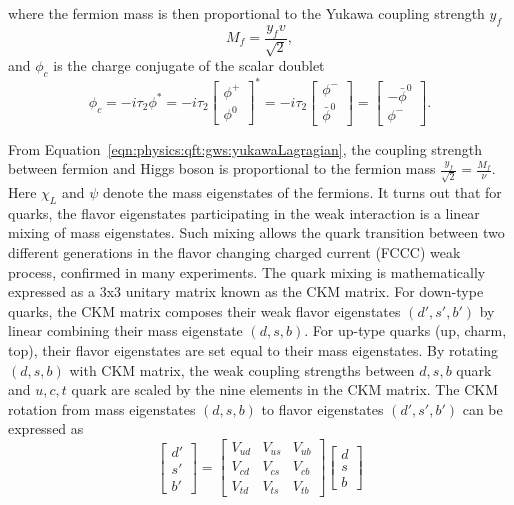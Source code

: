 \noindent where the fermion mass is then proportional to the Yukawa coupling strength $y_f$ 
\begin{equation}
    M_f =\frac{y_f v}{\sqrt{2}} ,  %
\end{equation}
\noindent and $\phi_c$ is the charge conjugate of the scalar doublet 
\begin{equation}
    \phi_c = -i\tau_2 \phi^* = -i\tau_2 \begin{bmatrix} \phi^+ \\ \phi^0 \end{bmatrix}^* = -i\tau_2 \begin{bmatrix} \phi^- \\ \bar{\phi}^0 \end{bmatrix} = \begin{bmatrix} - \bar{\phi}^0 \\ \phi^-   \end{bmatrix}.
\end{equation}


\noindent From Equation~\ref{eqn:physics:qft:gws:yukawaLagragian}, the coupling strength between fermion and Higgs boson  is proportional to the fermion mass $\frac{y_f}{\sqrt{2}} = \frac{M_f}{\nu}$. Here $\chi_L$ and $\psi$  denote the mass eigenstates of the fermions. It turns out that for quarks, the flavor eigenstates participating in the weak interaction is a linear mixing of mass eigenstates. Such mixing allows the quark transition between two different generations in the flavor changing charged current (FCCC) weak process, confirmed in many experiments. The quark mixing is mathematically expressed as a 3x3 unitary matrix known as the CKM matrix. For down-type quarks, the CKM matrix composes their weak flavor eigenstates $(d',s',b')$ by linear combining their mass eigenstate $(d,s,b)$. For up-type quarks (up, charm, top), their flavor eigenstates are set equal to their mass eigenstates. By rotating $(d,s,b)$ with CKM matrix, the weak coupling strengths between $d,s,b$ quark and $u,c,t$ quark are scaled by the nine elements in the CKM matrix. The CKM rotation from mass eigenstates $(d,s,b)$ to flavor eigenstates $(d',s',b')$ can be expressed as
\begin{equation}
    \begin{bmatrix}
        d' \\ s' \\ b' 
    \end{bmatrix} = 
     \begin{bmatrix}
        V_{ud} & V_{us} & V_{ub} \\ V_{cd} & V_{cs} & V_{cb} \\ V_{td} & V_{ts} & V_{tb}
    \end{bmatrix}   
    \begin{bmatrix}
        d \\ s \\ b
    \end{bmatrix}
\end{equation}

